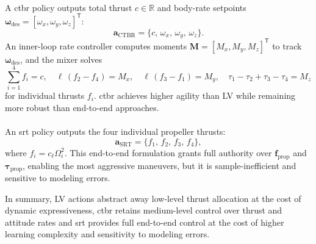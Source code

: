\paragraph{}  
A \gls{ctbr} policy outputs total thrust \(c\in\mathbb{R}\) and body-rate setpoints \(\boldsymbol{\omega}_{\mathrm{des}}=[\omega_x,\omega_y,\omega_z]^\mathsf{T}\):
\begin{equation}
\mathbf{a}_{\mathrm{CTBR}} = \{c,\,\omega_x,\,\omega_y,\,\omega_z\}.
\end{equation}
An inner-loop rate controller computes moments \(\mathbf{M}=[M_x,M_y,M_z]^\mathsf{T}\) to track \(\boldsymbol{\omega}_{\mathrm{des}}\), and the mixer solves
\begin{equation}
\sum_{i=1}^4 f_i = c, 
\quad
\ell\,(f_2 - f_4) = M_x, 
\quad
\ell\,(f_3 - f_1) = M_y, 
\quad
\tau_1 - \tau_2 + \tau_3 - \tau_4 = M_z
\end{equation}
for individual thrusts \(f_i\). \gls{ctbr} achieves higher agility than LV while remaining more robust than end-to-end approaches.

\paragraph{}
An \gls{srt} policy outputs the four individual propeller thrusts:
\begin{equation}
\mathbf{a}_{\mathrm{SRT}} = \{f_1,\,f_2,\,f_3,\,f_4\},
\end{equation}
where \(f_i = c_\ell \Omega_i^2\). This end-to-end formulation grants full authority over \(\mathbf{f}_{\mathrm{prop}}\) and \(\boldsymbol{\tau}_{\mathrm{prop}}\), enabling the most aggressive maneuvers, but it is sample-inefficient and sensitive to modeling errors.

In summary, LV actions abstract away low-level thrust allocation at the cost of dynamic expressiveness, \gls{ctbr} retains medium-level control over thrust and attitude rates and \gls{srt} provides full end-to-end control at the cost of higher learning complexity and sensitivity to modeling errors.
